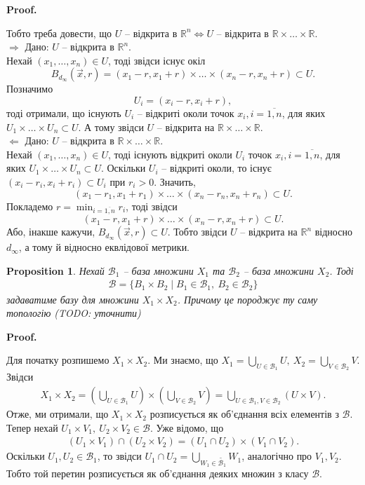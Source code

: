 \documentclass[a4paper, 10pt]{article}
\makeatletter
\def\rightproof{$\boxed{\Rightarrow}$ }
\def\leftproof{$\boxed{\Leftarrow}$ }
\theoremstyle{theoremdd}
\newtheorem{proposition}[theorem]{Proposition}
\renewenvironment{proof}[1][Proof.\\]{\par
\pushQED{\hfill \qed}%
\normalfont \topsep6\p@\@plus6\p@\relax
\trivlist
\item\relax
{\bfseries
#1\@addpunct{.}}\hspace\labelsep\ignorespaces
}{%
\popQED\endtrivlist\@endpefalse
}
\makeatother
\begin{document}
\begin{proof}
Тобто треба довести, що $U$ -- відкрита в $\mathbb{R}^n \iff U$ -- відкрита в $\mathbb{R} \times \dots \times \mathbb{R}$.\\
\rightproof Дано: $U$ -- відкрита в $\mathbb{R}^n$. \\
Нехай $(x_1,\dots,x_n) \in U$, тоді звідси існує окіл \[
B_{d_\infty}(\vec{x},r) = (x_1-r,x_1+r) \times \dots \times (x_n-r,x_n+r) \subset U.
\] Позначимо \[
U_i = (x_i-r,x_i+r),
\] тоді отримали, що існують $U_i$ -- відкриті околи точок $x_i, i = \overline{1,n}$, для яких $U_1 \times \dots \times U_n \subset U$. А тому звідси $U$ -- відкрита на $\mathbb{R} \times \dots \times \mathbb{R}$.
\bigskip \\
\leftproof Дано: $U$ -- відкрита в $\mathbb{R} \times \dots \times \mathbb{R}$.\\
Нехай $(x_1,\dots,x_n) \in U$, тоді існують відкриті околи $U_i$ точок $x_i, i = \overline{1,n}$, для яких $U_1 \times \dots \times U_n \subset U$. Оскільки $U_i$ -- відкриті околи, то існує $(x_i-r_i,x_i+r_i) \subset U_i$ при $r_i > 0$. Значить, 
\[
(x_1-r_1,x_1+r_1) \times \dots \times (x_n-r_n,x_n+r_n) \subset U.
\]
Покладемо $r = \displaystyle\min_{i = \overline{1,n}} r_i$, тоді звідси \[
(x_1-r,x_1+r) \times \dots \times (x_n-r,x_n+r) \subset U.
\] Або, інакше кажучи, $B_{d_\infty}(\vec{x},r) \subset U$. Тобто звідси $U$ -- відкрита на $\mathbb{R}^n$ відносно $d_\infty$, а тому й відносно еквлідової метрики.
\end{proof}

\begin{proposition}
Нехай $\mathcal{B}_1$ -- база множини $X_1$ та $\mathcal{B}_2$ -- база множини $X_2$. Тоді
\begin{align*}
\mathcal{B} = \{ B_1 \times B_2 \mid B_1 \in \mathcal{B}_1,\ B_2 \in \mathcal{B}_2 \}
\end{align*}
задаватиме базу для множини $X_1 \times X_2$. Причому це породжує ту саму топологію (TODO: уточнити)
\end{proposition}

\begin{proof}
Для початку розпишемо $X_1 \times X_2$. Ми знаємо, що $X_1 = \displaystyle\bigcup_{U \in \mathcal{B}_1} U,\ X_2 = \displaystyle\bigcup_{V \in \mathcal{B}_2} V$. Звідси
\begin{align*}
X_1 \times X_2 = \left( \bigcup_{U \in \mathcal{B}_1} U \right) \times \left( \bigcup_{V \in \mathcal{B}_2} V \right) = \bigcup_{U \in \mathcal{B}_1, V \in \mathcal{B}_2} (U \times V).
\end{align*}
Отже, ми отримали, що $X_1 \times X_2$ розписується як об'єднання всіх елементів з $\mathcal{B}$.\\
Тепер нехай $U_1 \times V_1,\ U_2 \times V_2 \in \mathcal{B}$. Уже відомо, що
\begin{align*}
(U_1 \times V_1) \cap (U_2 \times V_2) = (U_1 \cap U_2) \times (V_1 \cap V_2).
\end{align*}
Оскільки $U_1,U_2 \in \mathcal{B}_1$, то звідси $U_1 \cap U_2 = \displaystyle\bigcup_{W_1 \in \tilde{\mathcal{B}_1}} W_1$, аналогічно про $V_1,V_2$. Тобто той перетин розписується як об'єднання деяких множин з класу $\mathcal{B}$.
\end{proof}
\end{document}
